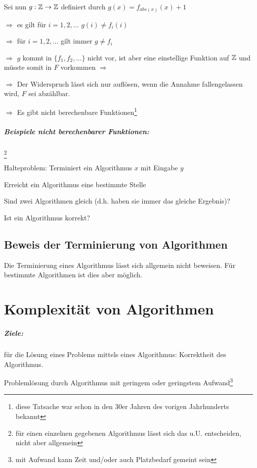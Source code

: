 \begin{compactitem}
\begin{compactitem}
		\item Sei nun $g: \mathbb{Z} \to \mathbb{Z}$ definiert durch $g(x) = f_{abs(x)}(x) + 1$
		\item $\Rightarrow$ es gilt für $i = 1, 2, \ldots$ $g(i) \ne f_i(i)$
		\item $\Rightarrow$ für $i = 1, 2, \ldots$ gilt immer $g \ne f_i$
		\item $\Rightarrow$ $g$ kommt in $\{f_1, f_2, \ldots \}$ nicht vor, ist aber eine einstellige Funktion auf $\mathbb{Z}$ und müsste somit in $F$ vorkommen $\Rightarrow$ 
		\item $\Rightarrow$ Der Widerspruch lässt sich nur auflösen, wenn die Annahme fallengelassen wird, $F$ sei abzählbar.
		\item $\Rightarrow$ Es gibt nicht berechenbare Funktionen\footnote{diese Tatsache war schon in den 30er Jahren des vorigen Jahrhunderts bekannt}
	\end{compactitem}
	\paragraph{Beispiele nicht berechenbarer Funktionen:}\footnote{für einen einzelnen gegebenen Algorithmus lässt sich das u.U. entscheiden, nicht aber allgemein}
	\begin{compactitem}
		\item Halteproblem: Terminiert ein Algorithmus $x$ mit Eingabe $y$
		\item Erreicht ein Algorithmus eine bestimmte Stelle
		\item Sind zwei Algorithmen gleich (d.h. haben sie immer das gleiche Ergebnis)?
		\item Ist ein Algorithmus korrekt?
	\end{compactitem}
\end{compactitem}

\section{Beweis der Terminierung von Algorithmen}
Die Terminierung eines Algorithmus lässt sich allgemein nicht beweisen. Für bestimmte Algorithmen ist dies aber möglich.

\chapter{Komplexität von Algorithmen}
\paragraph{Ziele:}
\begin{compactenum}
	\item\label{en1} für die Lösung eines Problems mittels eines Algorithmus: Korrektheit des Algorithmus.
	\item\label{en2} Problemlösung durch Algorithmus mit geringem oder geringstem Aufwand\footnote{mit Aufwand kann Zeit und/oder auch Platzbedarf gemeint sein}
\end{compactenum}


